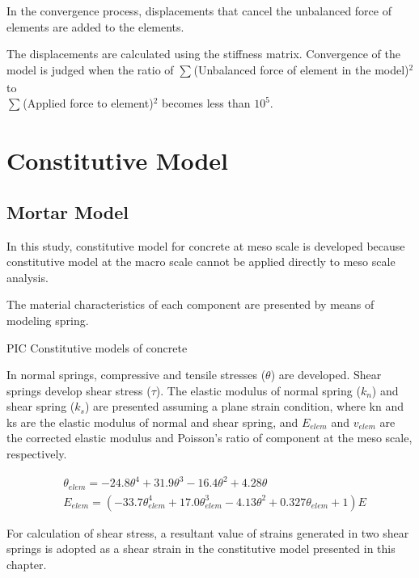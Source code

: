 In the convergence process, displacements that cancel the unbalanced force of elements are added to the elements.

The displacements are calculated using the stiffness matrix. Convergence of the model is judged when the ratio of
$\sum_{} $(Unbalanced force of element in the model)$^2$ to \\
$\sum_{} $(Applied force to element)$^2$ becomes less than $10^5$.

\section{Constitutive Model}

\subsection{Mortar Model}

In this study, constitutive model for concrete at meso scale is developed because constitutive model at the  macro scale cannot be applied directly to meso scale analysis.

The material characteristics of each component are presented by means of modeling spring.

PIC Constitutive models of concrete

In normal springs, compressive and tensile stresses ($\theta$) are developed. Shear springs develop shear stress ($\tau$). The elastic modulus of normal spring ($k_n$) and shear spring ($k_s$) are presented assuming a plane strain condition, where kn and ks are the elastic modulus of normal and shear spring, and $E_{elem}$ and $v_{elem}$ are the corrected elastic modulus and Poisson’s ratio of component at the meso scale, respectively.

\begin{equation}
  \begin{aligned}
   &\theta_{elem} = -24.8\theta^4 + 31.9\theta^3 - 16.4\theta^2 + 4.28\theta \\
   &E_{elem} = (-33.7\theta_{elem}^4 + 17.0\theta_{elem}^3 - 4.13\theta^2 + 0.327\theta_{elem}+1)E
  \end{aligned}
\end{equation}

For calculation of shear stress, a resultant value of strains generated in two shear springs is adopted as a shear strain in the constitutive model presented in this chapter.

